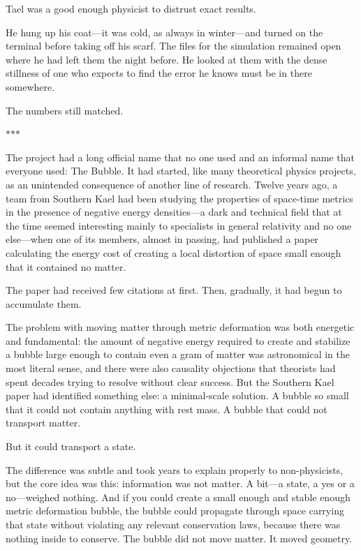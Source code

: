 \documentclass[11pt,a5paper,twoside]{book}
\begin{document}
Tael was a good enough physicist to distrust exact results.

He hung up his coat—it was cold, as always in winter—and turned on the terminal before taking off his scarf. The files for the simulation remained open where he had left them the night before. He looked at them with the dense stillness of one who expects to find the error he knows must be in there somewhere.

The numbers still matched.

\vspace{1.5em}
\begin{center}$\ast$\quad$\ast$\quad$\ast$\end{center}
\vspace{1.5em}

The project had a long official name that no one used and an informal name that everyone used: The Bubble. It had started, like many theoretical physics projects, as an unintended consequence of another line of research. Twelve years ago, a team from Southern Kael had been studying the properties of space-time metrics in the presence of negative energy densities—a dark and technical field that at the time seemed interesting mainly to specialists in general relativity and no one else—when one of its members, almost in passing, had published a paper calculating the energy cost of creating a local distortion of space small enough that it contained no matter.

The paper had received few citations at first. Then, gradually, it had begun to accumulate them.

The problem with moving matter through metric deformation was both energetic and fundamental: the amount of negative energy required to create and stabilize a bubble large enough to contain even a gram of matter was astronomical in the most literal sense, and there were also causality objections that theorists had spent decades trying to resolve without clear success. But the Southern Kael paper had identified something else: a minimal-scale solution. A bubble so small that it could not contain anything with rest mass. A bubble that could not transport matter.

But it could transport a state.

The difference was subtle and took years to explain properly to non-physicists, but the core idea was this: information was not matter. A bit—a state, a yes or a no—weighed nothing. And if you could create a small enough and stable enough metric deformation bubble, the bubble could propagate through space carrying that state without violating any relevant conservation laws, because there was nothing inside to conserve. The bubble did not move matter. It moved geometry.
\end{document}
